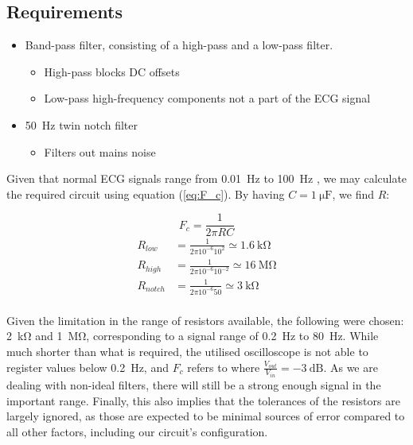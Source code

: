 \subsection{Requirements}
\begin{itemize}
    \item Band-pass filter, consisting of a high-pass and a low-pass filter.
    \begin{itemize}
        \item High-pass blocks DC offsets
        \item Low-pass high-frequency components not a part of the ECG signal
    \end{itemize}
    \item \SI{50}{\hertz} twin notch filter
    	\begin{itemize}
    		\item Filters out mains noise
    	\end{itemize}
\end{itemize}

Given that normal ECG signals range from \SI{0.01}{\hertz} to \SI{100}{\hertz} \citep{JianqiangLi2017DoaR}, we may calculate the required circuit using equation (\ref{eq:F_c}). By having $C = \SI{1}{\micro\farad}$, we find $R$:

\begin{equation}\label{eq:F_c}
    F_c = \frac{1}{2\pi RC}
\end{equation}
\begin{equation*}
\begin{split}
	R_{low} &= \frac{1}{2\pi 10^{-6} 10^2} \simeq \SI{1.6}{\kilo\ohm}\\
    R_{high} &= \frac{1}{2\pi 10^{-6} 10^{-2}} \simeq \SI{16}{\mega\ohm} \\
    R_{notch} &= \frac{1}{2\pi 10^{-6} 50} \simeq \SI{3}{\kilo\ohm} \\
\end{split}
\end{equation*}

Given the limitation in the range of resistors available, the following were chosen:
\SI{2}{\kilo\ohm} and \SI{1}{\mega\ohm}, corresponding to a signal range of \SI{0.2}{\hertz} to \SI{80}{\hertz}.
While much shorter than what is required, the utilised oscilloscope is not able to register values below \SI{0.2}{\hertz}, and $F_c$ refers to where $\frac{V_{out}}{V_{in}} = \SI{-3}{\deci\bel}$.
As we are dealing with non-ideal filters, there will still be a strong enough signal in the important range.
Finally, this also implies that the tolerances of the resistors are largely ignored, as those are expected to be minimal sources of error compared to all other factors, including our circuit's configuration.


